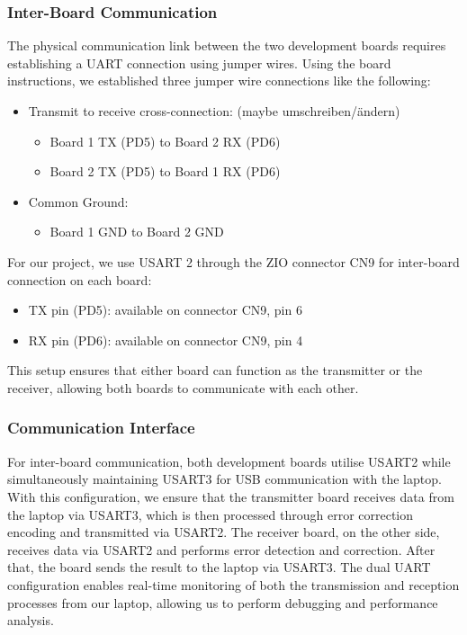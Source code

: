\documentclass{scrartcl}
\begin{document}
\subsubsection{Inter-Board Communication}
The physical communication link between the two development boards requires establishing a \gls{UART} connection using jumper wires. Using the board instructions, we established three jumper wire connections like the following:
\begin{itemize}
\item Transmit to receive cross-connection: (maybe umschreiben/ändern)
    \begin{itemize}
    \item Board 1 TX (PD5) to Board 2 RX (PD6)
    \item Board 2 TX (PD5) to Board 1 RX (PD6)
    \end{itemize}
\item Common Ground:
    \begin{itemize}
    \item Board 1 GND to Board 2 GND
    \end{itemize}
\end{itemize}
For our project, we use USART 2  through the ZIO connector CN9 for inter-board connection on each board:
\begin{itemize}
\item TX pin (PD5): available on connector CN9, pin 6
\item RX pin (PD6): available on connector CN9, pin 4
\end{itemize}
This setup ensures that either board can function as the transmitter or the receiver, allowing both boards to communicate with each other. 

\subsubsection{Communication Interface}
For inter-board communication, both development boards utilise USART2 while simultaneously maintaining USART3 for USB communication with the laptop. With this configuration, we ensure that the transmitter board receives data from the laptop via USART3, which is then processed through error correction encoding and transmitted via USART2. The receiver board, on the other side, receives data via USART2 and performs error detection and correction. After that, the board sends the result to the laptop via USART3.
The dual \gls{UART} configuration enables real-time monitoring of both the transmission and reception processes from our laptop, allowing us to perform debugging and performance analysis.
\end{document}

